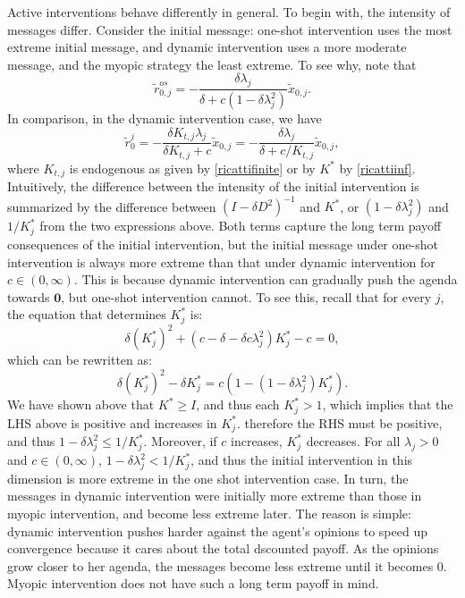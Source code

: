 \documentclass{article}
\begin{document}
Active interventions behave differently in general. To begin with, the intensity of messages differ. Consider the initial message: one-shot intervention uses the most extreme initial message, and dynamic intervention uses a more moderate message, and the myopic strategy the least extreme. To see why, note that 
$$\tilde r_{0,j}^{os}=-\frac{\delta \lambda_j}{\delta+c(1-\delta\lambda_j^2)}\tilde x_{0,j}.$$
In comparison, in the dynamic intervention case, we have
$$\tilde r_0^j=-\frac{\delta K_{t,j}\lambda_j}{\delta K_{t,j}+c}\tilde x_{0,j}=-\frac{\delta \lambda_j}{\delta+c/K_{t,j}}\tilde x_{0,j},$$ where $K_{t,j}$ is endogenous as given by \eqref{ricattifinite} or by $K^*$ by \eqref{ricattiinf}. 
Intuitively, the difference between the intensity of the initial intervention is summarized by the difference between $(I-\delta D^2)^{-1}$ and $K^*$, or $(1-\delta \lambda_j^2)$ and $1/K_j^*$ from the two expressions above. Both terms capture the long term payoff consequences of the initial intervention, but the initial message under one-shot intervention is always more extreme than that under dynamic intervention for $c\in(0,\infty)$. This is because dynamic intervention can gradually push the agenda towards $\mathbf 0$, but one-shot intervention cannot. To see this, recall that for every $j$, the equation that determines $K_j^*$ is:
$$\delta( K_j^*)^2+(c-\delta-\delta c \lambda_j^2)K_j^*-c=0,$$ which can be rewritten as:
$$\delta (K_j^*)^2-\delta K_j^*=c\left(1-(1-\delta\lambda_j^2)K_j^*\right).$$
We have shown above that $K^*\geq I$, and thus each $K_j^*>1$, which implies that the LHS above is positive and increases in $K_j^*$. therefore the RHS must be positive, and thus $1-\delta\lambda_j^2\leq 1/K_j^*$. Moreover, if $c$ increases, $K_j^*$ decreases. For all $\lambda_j>0$ and $c\in (0,\infty)$, $1-\delta\lambda_j^2< 1/K_j^*$, and thus the initial intervention in this dimension is more extreme in the one shot intervention case. In turn, the messages in dynamic intervention were initially more extreme than those in myopic intervention, and become less extreme later. The reason is simple: dynamic intervention pushes harder against the agent's opinions to speed up convergence because it cares about the total dscounted payoff. As the opinions grow closer to her agenda, the messages become less extreme until it becomes $0$. Myopic intervention does not have such a long term payoff in mind.
\end{document}
